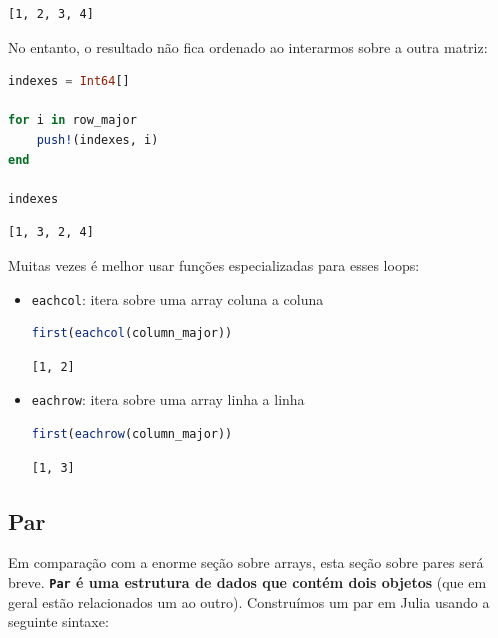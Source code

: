 \documentclass[
  notoc %
]{tufte-book}
\newcommand{\passthrough}[1]{#1}
\begin{document}
\begin{lstlisting}[language=Output]
[1, 2, 3, 4]
\end{lstlisting}

No entanto, o resultado não fica ordenado ao interarmos sobre a outra
matriz:

\begin{lstlisting}[language=Julia]
indexes = Int64[]

for i in row_major
    push!(indexes, i)
end

indexes
\end{lstlisting}

\begin{lstlisting}[language=Output]
[1, 3, 2, 4]
\end{lstlisting}

Muitas vezes é melhor usar funções especializadas para esses loops:

\begin{itemize}
\item
  \passthrough{\lstinline!eachcol!}: itera sobre uma array coluna a
  coluna

  \begin{lstlisting}[language=Julia]
  first(eachcol(column_major))
  \end{lstlisting}

  \begin{lstlisting}[language=Output]
  [1, 2]
  \end{lstlisting}
\item
  \passthrough{\lstinline!eachrow!}: itera sobre uma array linha a linha

  \begin{lstlisting}[language=Julia]
  first(eachrow(column_major))
  \end{lstlisting}

  \begin{lstlisting}[language=Output]
  [1, 3]
  \end{lstlisting}
\end{itemize}

\hypertarget{sec:pair}{%
\subsection{Par}\label{sec:pair}}

Em comparação com a enorme seção sobre arrays, esta seção sobre pares
será breve. \textbf{\passthrough{\lstinline!Par!} é uma estrutura de
dados que contém dois objetos} (que em geral estão relacionados um ao
outro). Construímos um par em Julia usando a seguinte sintaxe:
\end{document}
